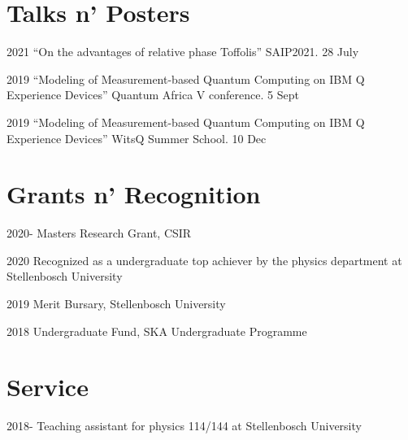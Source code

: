 \documentclass[12pt,letterpaper]{report}
\begin{document}
	\section*{Talks n' Posters}

	\begin{tablist}
       \item[2021] \tab{}\enquote{On the advantages of relative phase Toffolis} SAIP2021. 28 July
	   \item[2019] \tab{}\enquote{Modeling of Measurement-based Quantum Computing on IBM Q Experience Devices} Quantum Africa V conference. 5 Sept 
       \item[2019] \tab{}\enquote{Modeling of Measurement-based Quantum Computing on IBM Q Experience Devices} WitsQ Summer School. 10 Dec 
	\end{tablist}

	\section*{Grants n' Recognition}

	\begin{tablist}
		\item[2020-] \tab{}Masters Research Grant, CSIR
		\item[2020] \tab{}Recognized as a undergraduate top achiever by the physics department at Stellenbosch University
		\item[2019] \tab{}Merit Bursary, Stellenbosch University
		\item[2018] \tab{}Undergraduate Fund, SKA Undergraduate Programme
	\end{tablist}


	\section*{Service}
	\begin{tablist}
		\item[2018-] \tab{} Teaching assistant for physics 114/144 at Stellenbosch University
	\end{tablist}
\end{document}
